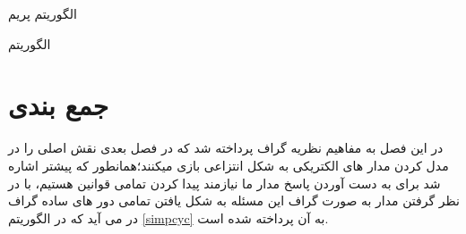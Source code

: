 \begin{algorithm}[ht]
	\onehalfspacing
	\caption{الگوریتم پریم} 
	\label{prim}
	\begin{algorithmic}[1]
		\REQUIRE
		\ENSURE
		\STATE
		\STATE
		\STATE
		\STATE
		\STATE
		\STATE
				
	\end{algorithmic}
\end{algorithm}

\begin{algorithm}[ht]
	\onehalfspacing
	\caption{الگوریتم 
} 
	\label{dfs}
	\begin{algorithmic}[1]
		\REQUIRE
		\ENSURE
		\STATE
		\STATE
		\STATE
		\STATE
		\STATE
		\STATE
		\STATE
		\STATE
		\STATE
		
	\end{algorithmic}
\end{algorithm}

\section{جمع بندی}
در این فصل به مفاهیم نظریه گراف پرداخته شد که در فصل بعدی نقش اصلی را در مدل کردن مدار های الکتریکی به شکل انتزاعی بازی میکنند؛همانطور که پیشتر اشاره شد برای به دست آوردن پاسخ مدار ما نیازمند پیدا کردن تمامی قوانین
هستیم، با در نظر گرفتن مدار به صورت گراف این مسئله به شکل یافتن تمامی دور های ساده گراف
در می آید که در الگوریتم
\eqref{simpcyc}
به آن پرداخته شده است.